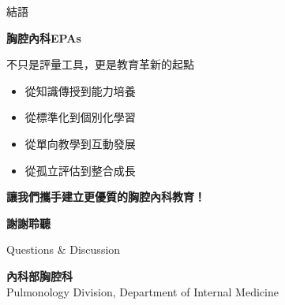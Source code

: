\documentclass[aspectratio=169]{beamer}
\begin{document}
\begin{frame}{結語}
\begin{center}
\Large{\textcolor{emergency_red}{\textbf{胸腔內科EPAs}}}
\end{center}

\vspace{0.5cm}

\begin{center}
\large{不只是評量工具，更是教育革新的起點}
\end{center}

\vspace{1cm}

\begin{itemize}
\item 從知識傳授到能力培養
\item 從標準化到個別化學習
\item 從單向教學到互動發展
\item 從孤立評估到整合成長
\end{itemize}

\vspace{1cm}

\begin{center}
\textbf{\textcolor{emergency_blue}{讓我們攜手建立更優質的胸腔內科教育！}}
\end{center}
\end{frame}

\begin{frame}[plain]
\begin{center}
\Huge{\textcolor{emergency_blue}{\textbf{謝謝聆聽}}}

\vspace{1cm}

\Large{\textcolor{emergency_gray}{Questions \& Discussion}}

\vspace{1cm}

\textcolor{emergency_red}{\textbf{內科部胸腔科}}\\
\textcolor{emergency_blue}{Pulmonology Division, Department of Internal Medicine}
\end{center}
\end{frame}
\end{document}
